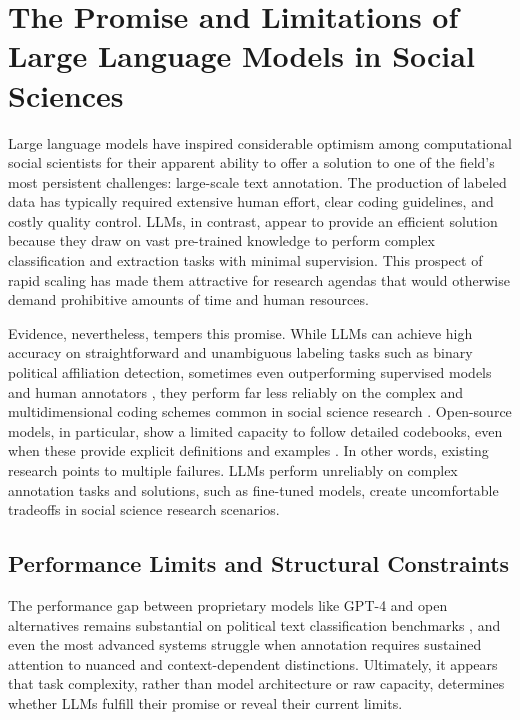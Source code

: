 \documentclass[12pt]{article}
\begin{document}
\section{The Promise and Limitations of Large Language Models in Social Sciences}

Large language models have inspired considerable optimism among computational social scientists for their apparent ability to offer a solution to one of the field’s most persistent challenges: large-scale text annotation. The production of labeled data has typically required extensive human effort, clear coding guidelines, and costly quality control. LLMs, in contrast, appear to provide an efficient solution because they draw on vast pre-trained knowledge to perform complex classification and extraction tasks with minimal supervision. This prospect of rapid scaling has made them attractive for research agendas that would otherwise demand prohibitive amounts of time and human resources. 

Evidence, nevertheless, tempers this promise. While LLMs can achieve high accuracy on straightforward and unambiguous labeling tasks such as binary political affiliation detection, sometimes even outperforming supervised models and human annotators \parencite{tornberg24a, gilardi_etal23}, they perform far less reliably on the complex and multidimensional coding schemes common in social science research \parencite{halterman_keith25, alizadeh_etal24a}. Open-source models, in particular, show a limited capacity to follow detailed codebooks, even when these provide explicit definitions and examples \parencite{halterman_keith25}. In other words, existing research points to multiple failures. LLMs perform unreliably on complex annotation tasks and solutions, such as fine-tuned models, create uncomfortable tradeoffs in social science research scenarios. 

\subsection{Performance Limits and Structural Constraints}

The performance gap between proprietary models like GPT-4 and open alternatives remains substantial on political text classification benchmarks \parencite{alizadeh_etal24a}, and even the most advanced systems struggle when annotation requires sustained attention to nuanced and context-dependent distinctions. Ultimately, it appears that task complexity, rather than model architecture or raw capacity, determines whether LLMs fulfill their promise or reveal their current limits.
\end{document}
